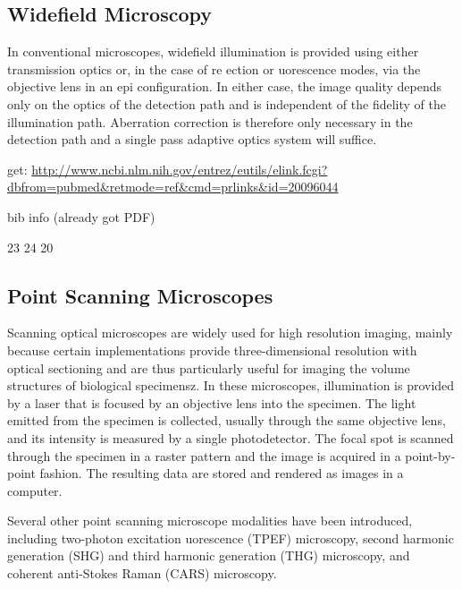 \subsection{Widefield Microscopy}
\label{sec:WidefieldMicroscopy}

In conventional microscopes, widefield illumination is provided using either 
transmission optics or, in the case of re ection or uorescence modes, via the 
objective lens in an epi configuration. In either case, the image quality 
depends only on the optics of the detection path and is independent of the 
fidelity of the illumination path.
Aberration correction is therefore only necessary in the detection path and a 
single pass adaptive optics system will suffice.



\cite{wide_MPFM}
\cite{wide_structured_illu}

get:
\url{http://www.ncbi.nlm.nih.gov/entrez/eutils/elink.fcgi?dbfrom=pubmed&retmode=ref&cmd=prlinks&id=20096044} 

bib info (already got PDF)

23 24 20
\subsection{Point Scanning Microscopes}
\label{sec:PointScanningMicroscopes}

Scanning optical microscopes are widely used for high resolution imaging, 
mainly because certain implementations provide three-dimensional resolution 
with optical sectioning and are thus particularly useful for imaging the 
volume structures of biological specimensz. In these microscopes, 
illumination is provided by a laser that is focused by an objective lens into 
the specimen. The light emitted from the specimen is collected, usually 
through the same objective lens, and its intensity is measured by a single 
photodetector. The focal spot is scanned through the specimen in a raster 
pattern and the image is acquired in a point-by-point fashion. The resulting 
data are stored and rendered as images in a computer.

Several other point scanning microscope modalities have been introduced, 
including two-photon excitation uorescence (TPEF) microscopy, second harmonic 
generation (SHG) and third harmonic generation (THG) microscopy, and coherent 
anti-Stokes Raman (CARS) microscopy.

